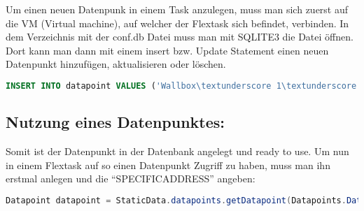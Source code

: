 Um einen neuen Datenpunk in einem Task anzulegen, muss man sich zuerst auf die VM (Virtual machine),  auf welcher der Flextask sich befindet, verbinden. In dem Verzeichnis mit der conf.db Datei muss man mit SQLITE3 die Datei öffnen. Dort kann man dann mit einem insert bzw. Update Statement einen neuen Datenpunkt hinzufügen, aktualisieren oder löschen.

\begin{lstlisting}[language=sql,caption=Example Element,label=lst:impl:foo]
    INSERT INTO datapoint VALUES ('Wallbox\textunderscore 1\textunderscore startCharching\textunderscore icon\textunderscore state',1,'','state\textunderscore [Wallbox\textunderscore 1\textunderscore startCharching\textunderscore icon]','','','INT',-1,-1,0.0,'');
\end{lstlisting}

\subsection{Nutzung eines Datenpunktes:}

Somit ist der Datenpunkt in der Datenbank angelegt und ready to use. Um nun in einem Flextask auf so einen Datenpunkt Zugriff zu haben, muss man ihn erstmal anlegen und die “SPECIFICADDRESS” angeben:

\begin{lstlisting}[language=java,caption=Example Datapoint,label=lst:impl:foo]
    Datapoint datapoint = StaticData.datapoints.getDatapoint(Datapoints.DatapointField.SPECIFIC\textunderscore ADDRESS, "SPECIFIC\textunderscore ADDRESS\textunderscore DES\textunderscore DATENPUNKTES"); 
\end{lstlisting}

